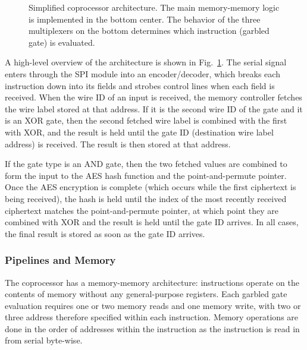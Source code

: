 \begin{figure}[ht]
	\centering
	
	\caption{Simplified coprocessor architecture. The main memory-memory logic is implemented in the bottom center. The behavior of the three multiplexers on the bottom determines which instruction (garbled gate) is evaluated.}%
	\label{fig:arch}
\end{figure}

A high-level overview of the architecture is shown in Fig.~\ref{fig:arch}. The serial signal enters through the SPI module into an encoder/decoder, which breaks each instruction down into its fields and strobes control lines when each field is received. When the wire ID of an input is received, the memory controller fetches the wire label stored at that address. If it is the second wire ID of the gate and it is an XOR gate, then the second fetched wire label is combined with the first with XOR, and the result is held until the gate ID (destination wire label address) is received. The result is then stored at that address.

If the gate type is an AND gate, then the two fetched values are combined to form the input to the AES hash function and the point-and-permute pointer. Once the AES encryption is complete (which occurs while the first ciphertext is being received), the hash is held until the index of the most recently received ciphertext matches the point-and-permute pointer, at which point they are combined with XOR and the result is held until the gate ID arrives. In all cases, the final result is stored as soon as the gate ID arrives.


\subsubsection{Pipelines and Memory}
The coprocessor has a memory-memory architecture: instructions operate on the contents of memory without any general-purpose registers. Each garbled gate evaluation requires one or two memory reads and one memory write, with two or three address therefore specified within each instruction. Memory operations are done in the order of addresses within the instruction as the instruction is read in from serial byte-wise.


